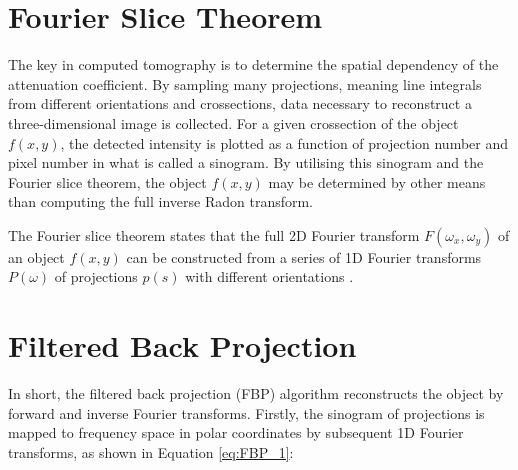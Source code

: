 
\section{Fourier Slice Theorem}
The key in computed tomography is to determine the spatial dependency of the attenuation coefficient.
By sampling many projections, meaning line integrals from different orientations and crossections, data necessary to reconstruct a three-dimensional image is collected.
For a given crossection of the object $f(x,y)$, the detected intensity is plotted as a function of projection number and pixel number in what is called a sinogram.
By utilising this sinogram and the Fourier slice theorem, the object $f(x,y)$ may be determined by other means than computing the full inverse Radon transform.


The Fourier slice theorem states that the full 2D Fourier transform $F(\omega_x, \omega_y)$ of an object $f(x,y)$ can be constructed from a series of 1D Fourier transforms $P(\omega)$ of projections $p(s)$ with different orientations \cite{zeng2010medical}.




\section{Filtered Back Projection}
In short, the filtered back projection (FBP) algorithm reconstructs the object by forward and inverse Fourier transforms.
Firstly, the sinogram of projections is mapped to frequency space in polar coordinates by subsequent 1D Fourier transforms, as shown in Equation \eqref{eq:FBP_1}:

